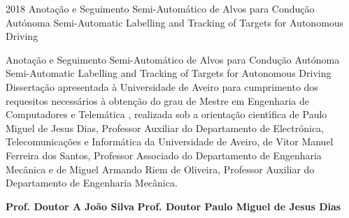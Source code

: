 \documentclass[11pt,twoside,a4paper]{report}
\def\ThesisYear{2018}
\begin{document}
%
%

\TitlePage
  \HEADER{\BAR} %
         {\ThesisYear}
        {Anota\c c\~ ao e Seguimento Semi-Autom\'atico de Alvos para Condu\c c\~ ao Aut\'onoma \newline Semi-Automatic Labelling and Tracking of Targets for Autonomous Driving}
\EndTitlePage
\titlepage\ \endtitlepage %

%
%

\TitlePage
  \HEADER{}{\ThesisYear}
        {Anota\c c\~ ao e Seguimento Semi-Autom\'atico de Alvos para Condu\c c\~ ao Aut\'onoma \newline Semi-Automatic Labelling and Tracking of Targets for Autonomous Driving}
  \vspace*{15mm}
  \TEXT{}
       {Disserta\c c\~ao apresentada \`a Universidade de Aveiro para cumprimento dos requesitos
        necess\'arios \`a obten\c c\~ao do grau de Mestre em Engenharia de Computadores e Telem\'atica , realizada sob a orienta\c c\~ao
        cient\'\i fica de Paulo Miguel de Jesus Dias, Professor Auxiliar do Departamento de Electr\'onica, Telecomunica\c c\~oes e Inform\'atica da Universidade de Aveiro, de Vitor Manuel Ferreira dos Santos, Professor Associado do Departamento de Engenharia Mec\^ anica e de Miguel Armando Riem de Oliveira, Professor Auxiliar do Departamento de Engenharia Mec\^ anica.}
\EndTitlePage
\titlepage\ \endtitlepage %

\TitlePage
  \vspace*{55mm}
       {}
       {\textbf{Prof. Doutor A}}
  \vspace*{5mm}
       {\textbf{Jo\~ao Silva}}
  \vspace*{5mm}
  \TEXT{}
       {\textbf{Prof. Doutor Paulo Miguel de Jesus Dias}}
\EndTitlePage
\titlepage\ \endtitlepage %
\end{document}
